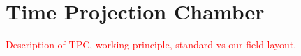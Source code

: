 \chapter{Time Projection Chamber}
\label{sec:tpc}
	\textcolor{red}{Description of TPC, working principle, standard vs our field layout.}